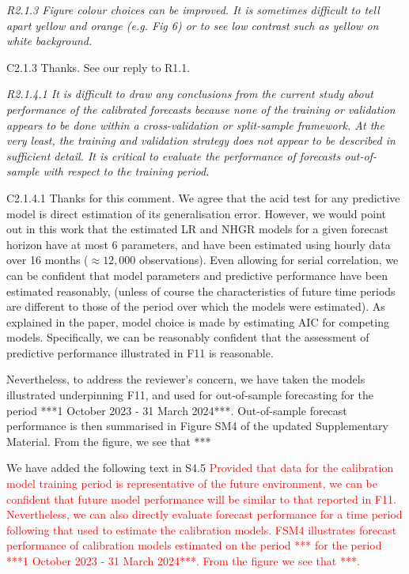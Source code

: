 \documentclass[a4paper,10pt]{article}
\newcommand{\ed}[1]{\textcolor{red}{#1}}
\begin{document}
	\emph{R2.1.3 Figure colour choices can be improved. It is sometimes difficult to tell apart yellow and orange (e.g. Fig 6) or to see low contrast such as yellow on white background.}
	
	C2.1.3 Thanks. See our reply to R1.1.
	
	\emph{R2.1.4.1 It is difficult to draw any conclusions from the current study about performance of the calibrated forecasts because none of the training or validation appears to be done within a cross-validation or split-sample framework. At the very least, the training and validation strategy does not appear to be described in sufficient detail. It is critical to evaluate the performance of forecasts out-of-sample with respect to the training period.}
	
	C2.1.4.1 Thanks for this comment. We agree that the acid test for any predictive model is direct estimation of its generalisation error. However, we would point out in this work that the estimated LR and NHGR models for a given forecast horizon have at most 6 parameters, and have been estimated using hourly data over 16 months ($\approx 12,000$ observations). Even allowing for serial correlation, we can be confident that model parameters and predictive performance have been estimated reasonably, (unless of course the characteristics of future time periods are different to those of the period over which the models were estimated). As explained in the paper, model choice is made by estimating AIC for competing models. Specifically, we can be reasonably confident that the assessment of predictive performance illustrated in F11 is reasonable. 
	
	Nevertheless, to address the reviewer's concern, we have taken the models illustrated underpinning F11, and used for out-of-sample forecasting for the period ***1 October 2023 - 31 March 2024***. Out-of-sample forecast performance is then summarised in Figure SM4 of the updated Supplementary Material. From the figure, we see that ***
	
	We have added the following text in S4.5 \ed{Provided that data for the calibration model training period is representative of the future environment, we can be confident that future model performance will be similar to that reported in F11. Nevertheless, we can also directly evaluate forecast performance for a time period following that used to estimate the calibration models. FSM4 illustrates forecast performance of calibration models estimated on the period *** for the period ***1 October 2023 - 31 March 2024***. From the figure we see that ***.}
	
\end{document}
